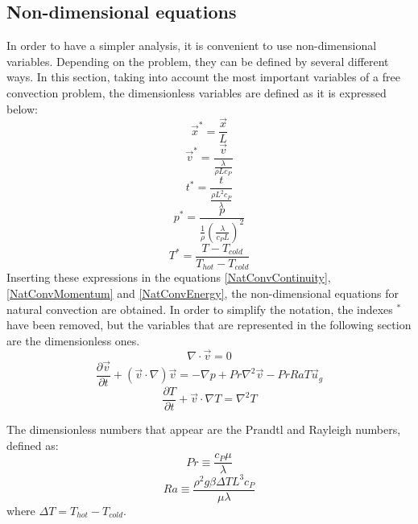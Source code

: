 \subsection{Non-dimensional equations}
In order to have a simpler analysis, it is convenient to use non-dimensional variables. Depending on the problem, they can be defined by several different ways. In this section, taking into account the most important variables of a free convection problem, the dimensionless variables are defined as it is expressed below:
\begin{equation}
\vec{x}^{*}=\frac{\vec{x}}{L}
\end{equation}
\begin{equation}
\vec{v}^{*}=\frac{\vec{v}}{\frac{\lambda}{\rho Lc_{P}}}
\end{equation}
\begin{equation}
t^{*}=\frac{t}{\frac{\rho L^{2}c_{P}}{\lambda}}
\end{equation}
\begin{equation}
p^{*}=\frac{p}{\frac{1}{\rho}\left(\frac{\lambda}{c_{P}L}\right)^2}
\end{equation}
\begin{equation}
T^{*}=\frac{T-T_{cold}}{T_{hot}-T_{cold}}
\label{DimensionlessTemperature}
\end{equation}
Inserting these expressions in the equations \ref{NatConvContinuity}, \ref{NatConvMomentum} and \ref{NatConvEnergy}, the non-dimensional equations for natural convection are obtained. In order to simplify the notation, the indexes $^{*}$ have been removed, but the variables that are represented in the following section are the dimensionless ones.
\begin{equation}
\nabla\cdot\vec{v}=0
\end{equation}
\begin{equation}
\frac{\partial\vec{v}}{\partial t}+\left(\vec{v}\cdot\nabla\right)\vec{v}=-\nabla p+Pr\nabla^{2}\vec{v}-PrRaT\vec{u}_{g}
\end{equation}
\begin{equation}
\frac{\partial T}{\partial t}+\vec{v}\cdot\nabla T=\nabla^{2}T
\end{equation}

The dimensionless numbers that appear are the Prandtl and Rayleigh numbers, defined as:
\begin{equation}
Pr\equiv\frac{c_{P}\mu}{\lambda}
\end{equation}
\begin{equation}
Ra\equiv\frac{\rho^{2} g\beta\Delta TL^{3}c_{P}}{\mu\lambda}
\end{equation}
where $\Delta T=T_{hot}-T_{cold}$.

